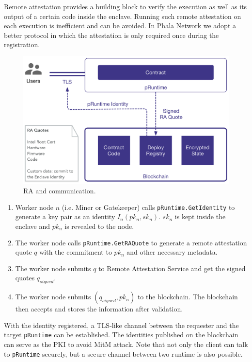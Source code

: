 Remote attestation provides a building block to verify the execution as well as its output of a certain code inside the enclave. Running such remote attestation on each execution is inefficient and can be avoided. In Phala Network we adopt a better protocol in which the attestation is only required once during the registration.

\begin{figure}
    \centering \footnotesize
    \includegraphics[width=.7\columnwidth]{img/pLIBRA-communication}
    \caption{RA and communication. }
    \label{fig:communication}
\end{figure}

\begin{enumerate}
    \item Worker node  $n$  (i.e. Miner or Gatekeeper) calls \texttt{pRuntime.GetIdentity} to generate a key pair as an identity $I_n(pk_n, sk_n)$.  $sk_n$ is kept inside the enclave and $pk_n$ is revealed to the node.

    \item The worker node calls \texttt{pRuntime.GetRAQuote} to generate a remote attestation quote $q$ with the commitment to $pk_n$ and other necessary metadata.

    \item The worker node submits $q$ to Remote Attestation Service and get the signed quotes $q_{signed}$.

    \item The worker node submits $(q_{signed}, pk_n)$ to the blockchain. The blockchain then accepts and stores the information after validation.
\end{enumerate}

With the identity registered, a TLS-like channel between the requester and the target \texttt{pRuntime} can be established. The identities published on the blockchain can serve as the PKI to avoid MitM attack. Note that not only the client can talk to \texttt{pRuntime} securely, but a secure channel between two runtime is also possible.

